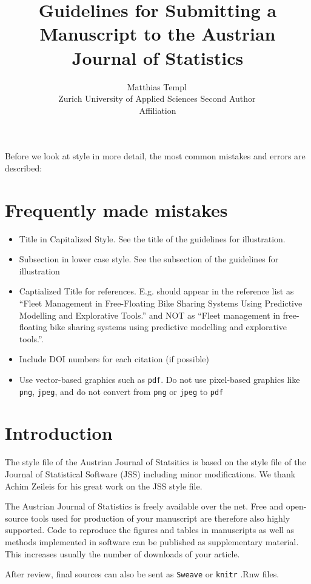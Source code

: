 \documentclass[article]{ajs}
\author{Matthias Templ\,\orcidlink{0000-0002-8638-5276}\\ Zurich University of Applied Sciences \And 
        Second Author\,\orcidlink{0000-0000-0000-0000}\\ Affiliation}
\title{Guidelines for Submitting a Manuscript to the Austrian Journal of Statistics}
\begin{document}

Before we look at style in more detail, the most common mistakes and errors are described:

\section{Frequently made mistakes}


\begin{itemize}
\item Title in Capitalized Style. See the title of the guidelines for illustration.
\item Subsection in lower case style. See the subsection of the guidelines for illustration
\item Captialized Title for references. E.g. \cite{fleet20} should appear in the reference list as ``Fleet Management in Free-Floating Bike Sharing Systems Using
  Predictive Modelling and Explorative Tools.'' and NOT as ``Fleet management in free-floating bike sharing systems using
  predictive modelling and explorative tools.''.
\item Include DOI numbers for each citation (if possible)
\item Use vector-based graphics such as \texttt{pdf}. Do not use pixel-based graphics like \texttt{png}, \texttt{jpeg}, and do not convert from \texttt{png} or \texttt{jpeg} to \texttt{pdf}
\end{itemize}

\section{Introduction}


The style file of the Austrian Journal of Statsitics is based on the style file of the Journal of Statistical Software (JSS) including minor modifications. We thank Achim Zeileis for his great work on the JSS style file.

The Austrian Journal of Statistics is freely available over the net. Free and open-source tools used for production of your manuscript are therefore also highly supported. Code to reproduce the figures and tables in manuscripts as well as methods implemented in software can be published as supplementary material. This increases usually the number of 
downloads of your article.

After review, final sources can also be sent as \texttt{Sweave} \citep[see, e.g.,][]{leisch02} or \texttt{knitr} \citep{yihui13} .Rnw files.
\end{document}
